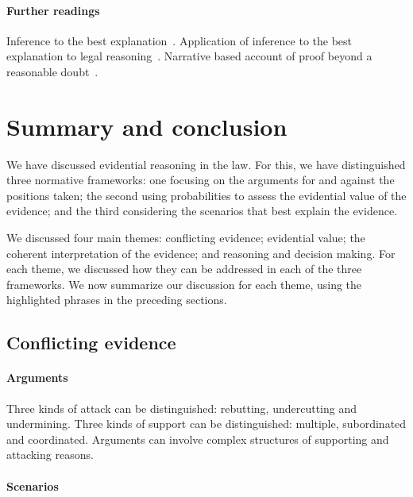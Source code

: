 \documentclass[10pt]{article}
\begin{document}
\paragraph{Further readings}

Inference to the best explanation~\citep{lipton1991}.
Application of inference to the best explanation 
to legal reasoning~\citep{pardoAllen2008}. 
Narrative based account of proof beyond a 
reasonable doubt~\citep{allen2010, allenStein2013}.
















\section{Summary and conclusion}

We have discussed evidential reasoning in the law. For this, we have distinguished three normative frameworks: one focusing on the arguments for and against the positions taken; the second using probabilities to assess the evidential value of the evidence; and the third considering the scenarios that best explain the evidence. 

We discussed four main themes: conflicting evidence; evidential value; the coherent interpretation of the evidence; and reasoning and decision making. For each theme, we discussed how they can be addressed in each of the three frameworks. We now summarize our discussion for each theme, using the highlighted phrases in the preceding sections.

\subsection*{Conflicting evidence}

\paragraph{Arguments}

Three kinds of attack can be distinguished: rebutting, undercutting and undermining.
Three kinds of support can be distinguished: multiple, subordinated and coordinated.
Arguments can involve complex structures of supporting and attacking reasons.

\paragraph{Scenarios}
\end{document}
